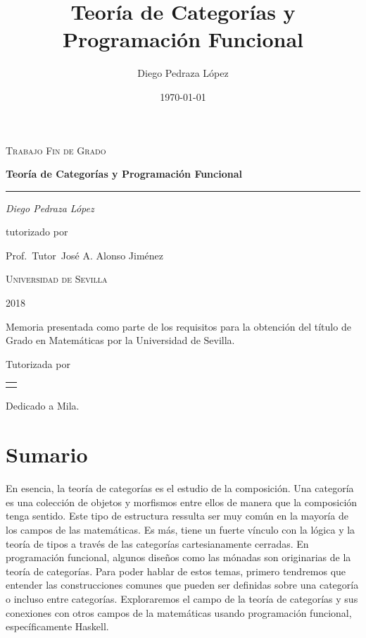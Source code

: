 \documentclass[\OPTfontsize, twoside]{book}
\title{Teoría de Categorías y Programación Funcional}
\author{Diego Pedraza López}
\date{\today}
\makeatletter
\newenvironment{dedication}
  {\clearpage           %
   \thispagestyle{empty}%
   \vspace*{\stretch{1}}%
   \itshape             %
   \raggedleft          %
  }
  {\par %
   \vspace{\stretch{3}} %
   \clearpage           %
  }
\renewcommand\maketitle{%
  \begin{titlepage}
  \parindent=0pt
  \begin{flushleft}
  \vspace*{1.5mm}
  \setlength\baselineskip{0pt}
  \setlength\parskip{0mm}
  \begin{center}
  \end{center}
  \end{flushleft}
  \vspace{1cm}
  \bgroup
  \Large \bfseries
  \begin{center}
  \@title
  \end{center}
  \egroup
  \vspace*{.5cm}
  \begin{center}
  \@author
  \end{center}
  \begin{center}
  2018
  \end{center}
  \vspace*{1.8cm}
  \begin{flushright}
  \begin{minipage}{8.45cm}
      Memoria presentada como parte de los requisitos para la obtención del título de
      Grado en Matemáticas por la Universidad de Sevilla.

      \vspace*{7.5mm}

      Tutorizada por
  \end{minipage}\par
  \begin{tabularx}{8.45cm}[b]{@{}l}
      \guardatutores
  \end{tabularx}
   \end{flushright}
      \vspace*{\fill}
   \end{titlepage}
   \pagestyle{tfg}
   \renewcommand{\chaptermark}[1]{\markright{\thechapter.\space ##1}}
   \renewcommand{\sectionmark}[1]{}
   \renewcommand{\subsectionmark}[1]{}
  }
\makeatother
\begin{document}
\begin{titlepage}
  \centering
  {\scshape\Large Trabajo Fin de Grado\par}
  \vspace{1.5cm}
  {\huge\bfseries Teoría de Categorías y Programación Funcional\par}
  \vspace{0.025cm}
  \rule{0.4\textwidth}{0.4pt}
  \vspace{1cm}

  {\Large\itshape Diego Pedraza López\par}
  \vspace{1cm}
  tutorizado por\par
  Prof.~Tutor~José A. Alonso Jiménez\par
  \vspace{1cm}
  \vspace{7cm}

  {\scshape\LARGE Universidad de Sevilla \par}
  \vfill
\end{titlepage}

\maketitle

\begin{dedication}
Dedicado a Mila.  
\end{dedication}
\frontmatter

\tableofcontents

\mainmatter

\chapter*{Sumario}
En esencia, la teoría de categorías es el estudio de la composición.
Una categoría es una colección de objetos y morfismos entre ellos de manera que la composición tenga sentido.
Este tipo de estructura ressulta ser muy común en la mayoría de los campos de las matemáticas.
Es más, tiene un fuerte vínculo con la lógica y la teoría de tipos a través de las categorías cartesianamente cerradas.
En programación funcional, algunos diseños como las mónadas son originarias de la teoría de categorías.
Para poder hablar de estos temas, primero tendremos que entender las construcciones comunes que pueden ser definidas sobre una categoría o incluso entre categorías.
Exploraremos el campo de la teoría de categorías y sus conexiones con otros campos de la matemáticas usando programación funcional, específicamente Haskell.
\end{document}
